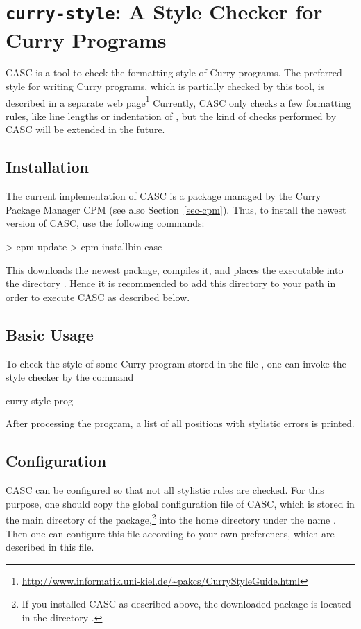 \section{\texttt{curry-style}: A Style Checker for Curry Programs}
\label{sec-casc}

CASC
is a tool to check the formatting style of Curry programs.
The preferred style for writing Curry programs,
which is partially checked by this tool,
is described in a separate web page\footnote{%
\url{http://www.informatik.uni-kiel.de/~pakcs/CurryStyleGuide.html}}
Currently, CASC only checks a few formatting rules, like
line lengths or
indentation of , but the kind of checks
performed by CASC will be extended in the future.

\subsection{Installation}

The current implementation of CASC is a package
managed by the Curry Package Manager CPM
(see also Section~\ref{sec-cpm}).
Thus, to install the newest version of CASC, use the following commands:
%
\begin{curry}
> cpm update
> cpm installbin casc
\end{curry}
%
This downloads the newest package, compiles it, and places
the executable  into the directory .
Hence it is recommended to add this directory to your path
in order to execute CASC as described below.

\subsection{Basic Usage}

To check the style of some Curry program stored
in the file ,
one can invoke the style checker by
the command
%
\begin{curry}
curry-style prog
\end{curry}
%
After processing the program, a list of all positions
with stylistic errors is printed.


\subsection{Configuration}

CASC can be configured so that not all stylistic rules are checked.
For this purpose, one should copy the global configuration file
 of CASC,
which is stored in the main directory of the package,\footnote{%
If you installed CASC as described above,
the downloaded package is located in the directory
.}
into the home directory under the name .
Then one can configure this file according to your own preferences,
which are described in this file.

